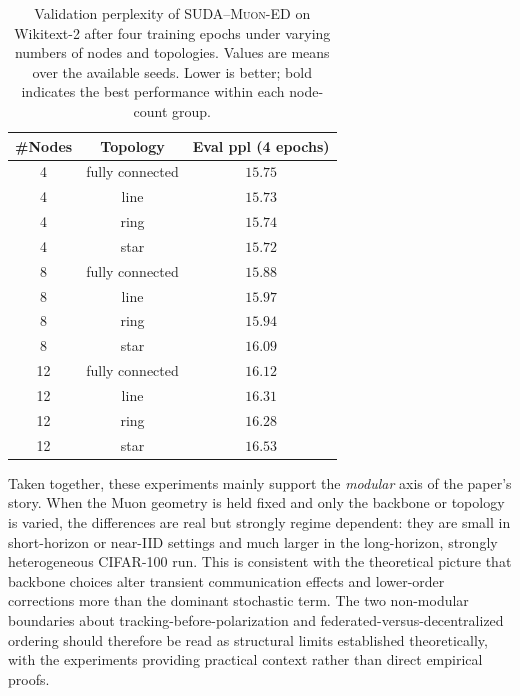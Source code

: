 \documentclass{article}
\begin{document}
\begin{table}[t!]
    \centering
    \caption{Validation perplexity of \textsc{SUDA--Muon-ED} on Wikitext-2
    after four training epochs under varying numbers of nodes and topologies.
    Values are means over the available seeds. Lower is better; bold indicates
    the best performance within each node-count group.}
    \label{tab:gpt-ablation}
    \begin{tabular}{ccc}
        \toprule
        \#Nodes & Topology & Eval ppl (4 epochs) \\
        \midrule
        4  & fully connected & $15.75$ \\
        4  & line            & $15.73$ \\
        4  & ring            & $15.74$ \\
        4  & star            & $\mathbf{15.72}$ \\
        \midrule
        8  & fully connected & $\mathbf{15.88}$ \\
        8  & line            & $15.97$ \\
        8  & ring            & $15.94$ \\
        8  & star            & $16.09$ \\
        \midrule
        12 & fully connected & $\mathbf{16.12}$ \\
        12 & line            & $16.31$ \\
        12 & ring            & $16.28$ \\
        12 & star            & $16.53$ \\
        \bottomrule
    \end{tabular}
\end{table}

Taken together, these experiments mainly support the \emph{modular} axis of
the paper's story. When the Muon geometry is held fixed and only the backbone
or topology is varied, the differences are real but strongly regime dependent:
they are small in short-horizon or near-IID settings and much larger in the
long-horizon, strongly heterogeneous CIFAR-100 run. This is consistent with the
theoretical picture that backbone choices alter transient communication effects
and lower-order corrections more than the dominant stochastic term. The
two non-modular boundaries about tracking-before-polarization and
federated-versus-decentralized ordering should therefore be read as structural
limits established theoretically, with the experiments providing practical
context rather than direct empirical proofs.
\end{document}
